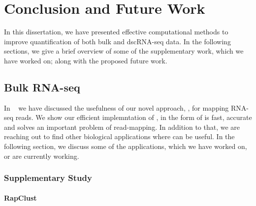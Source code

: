 
\chapter{Conclusion and Future Work} %
\label{conclusion} %



In this dissertation, we have presented effective computational methods to improve 
quantification of both bulk and dscRNA-seq data. In the following sections, we
give a brief overview of some of the supplementary work, which we have worked on;
along with the proposed future work.

\section{Bulk RNA-seq}

In ~ we have discussed the usefulness of our novel approach, \qm, 
for mapping RNA-seq reads. We show our efficient implemntation of \qm, in the 
form of \rapmap is fast, accurate and solves an important problem of read-mapping. 
In addition to that, we are reaching out to find other biological applications where 
\rapmap can be useful. In the following section, we discuss some of the applications, 
which we have worked on, or are currently working. 

\subsection{Supplementary Study}
\subsubsection{RapClust~\citep{srivastava2016accurate}}

